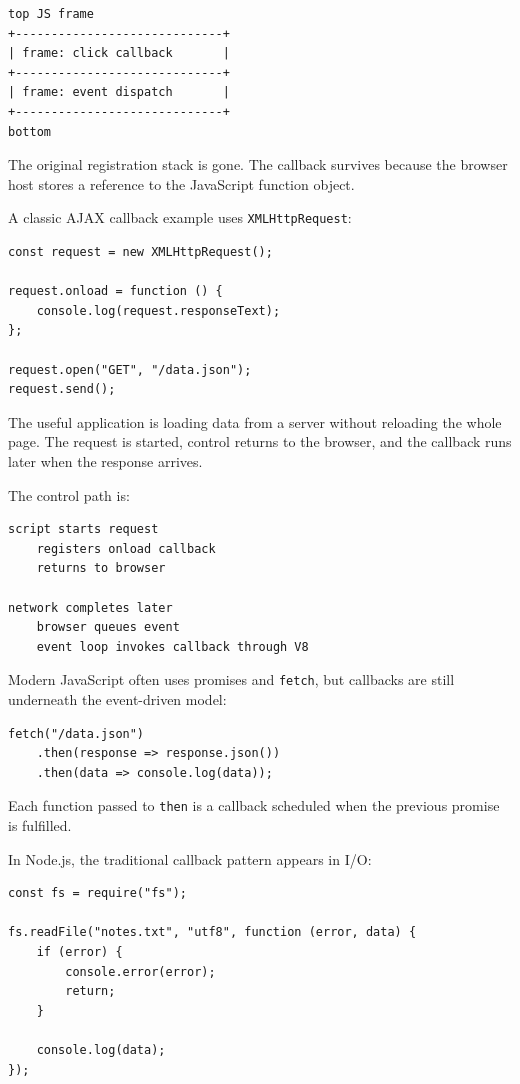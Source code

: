 \begin{verbatim}
top JS frame
+-----------------------------+
| frame: click callback       |
+-----------------------------+
| frame: event dispatch       |
+-----------------------------+
bottom
\end{verbatim}

The original registration stack is gone. The callback survives because the browser host stores a reference to the JavaScript function object.

A classic AJAX callback example uses \texttt{XMLHttpRequest}:

\begin{verbatim}
const request = new XMLHttpRequest();

request.onload = function () {
    console.log(request.responseText);
};

request.open("GET", "/data.json");
request.send();
\end{verbatim}

The useful application is loading data from a server without reloading the whole page. The request is started, control returns to the browser, and the callback runs later when the response arrives.

The control path is:

\begin{verbatim}
script starts request
    registers onload callback
    returns to browser

network completes later
    browser queues event
    event loop invokes callback through V8
\end{verbatim}

Modern JavaScript often uses promises and \texttt{fetch}, but callbacks are still underneath the event-driven model:

\begin{verbatim}
fetch("/data.json")
    .then(response => response.json())
    .then(data => console.log(data));
\end{verbatim}

Each function passed to \texttt{then} is a callback scheduled when the previous promise is fulfilled.

In Node.js, the traditional callback pattern appears in I/O:

\begin{verbatim}
const fs = require("fs");

fs.readFile("notes.txt", "utf8", function (error, data) {
    if (error) {
        console.error(error);
        return;
    }

    console.log(data);
});
\end{verbatim}

